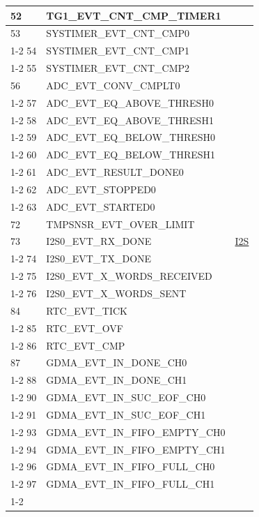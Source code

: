 \documentclass[main\_\_CN.tex]{subfiles}
\begin{document}
\begin{longtable}{ | l | l | l | }
52  & TG1\_EVT\_CNT\_CMP\_TIMER1    & \\ \hline
53  & SYSTIMER\_EVT\_CNT\_CMP0  & \nameref{mod:systimer}     \\ \cline{1-2}
54  & SYSTIMER\_EVT\_CNT\_CMP1  & \\ \cline{1-2}
55  & SYSTIMER\_EVT\_CNT\_CMP2  & \\ \hline
56  & ADC\_EVT\_CONV\_CMPLT0    & \nameref{mod:adc}   \\ \cline{1-2}
57  & ADC\_EVT\_EQ\_ABOVE\_THRESH0     & \\ \cline{1-2}
58  & ADC\_EVT\_EQ\_ABOVE\_THRESH1     & \\ \cline{1-2}
59  & ADC\_EVT\_EQ\_BELOW\_THRESH0     & \\ \cline{1-2}
60  & ADC\_EVT\_EQ\_BELOW\_THRESH1     & \\ \cline{1-2}
61  & ADC\_EVT\_RESULT\_DONE0     & \\ \cline{1-2}
62  & ADC\_EVT\_STOPPED0 & \\ \cline{1-2}
63  & ADC\_EVT\_STARTED0 & \\ \hline
72 & TMPSNSR\_EVT\_OVER\_LIMIT & \nameref{mod:tmpsen}  \\ \hline
73 & I2S0\_EVT\_RX\_DONE & \hyperref[mod:i2s]{I2S}   \\ \cline{1-2}
74 & I2S0\_EVT\_TX\_DONE & \\ \cline{1-2}
75 & I2S0\_EVT\_X\_WORDS\_RECEIVED     & \\ \cline{1-2}
76 & I2S0\_EVT\_X\_WORDS\_SENT  & \\ \hline
84 & RTC\_EVT\_TICK     & \nameref{mod:rtctimer}   \\ \cline{1-2}
85 & RTC\_EVT\_OVF      & \\ \cline{1-2}
86 & RTC\_EVT\_CMP      & \\ \hline
87 & GDMA\_EVT\_IN\_DONE\_CH0  &  \nameref{mod:dma} \\ \cline{1-2}
88 & GDMA\_EVT\_IN\_DONE\_CH1  & \\ \cline{1-2}
90 & GDMA\_EVT\_IN\_SUC\_EOF\_CH0     & \\ \cline{1-2}
91 & GDMA\_EVT\_IN\_SUC\_EOF\_CH1     & \\ \cline{1-2}
93 & GDMA\_EVT\_IN\_FIFO\_EMPTY\_CH0  & \\ \cline{1-2}
94 & GDMA\_EVT\_IN\_FIFO\_EMPTY\_CH1  & \\ \cline{1-2}
96 & GDMA\_EVT\_IN\_FIFO\_FULL\_CH0   & \\ \cline{1-2}
97 & GDMA\_EVT\_IN\_FIFO\_FULL\_CH1   & \\ \cline{1-2}

\end{longtable}
\end{document}
